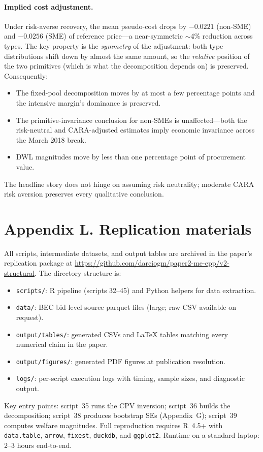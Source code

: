 \documentclass[12pt]{article}
\begin{document}
\paragraph{Implied cost adjustment.}
Under risk-averse recovery, the mean pseudo-cost drops by
$-0.0221$ (non-SME) and $-0.0256$ (SME) of reference price---a
near-symmetric $\sim$4\% reduction across types. The key
property is the \emph{symmetry} of the adjustment: both type
distributions shift down by almost the same amount, so the
\emph{relative} position of the two primitives (which is what
the decomposition depends on) is preserved. Consequently:
\begin{itemize}
\item The fixed-pool decomposition moves by at most a few
percentage points and the intensive margin's dominance is
preserved.
\item The primitive-invariance conclusion for non-SMEs is
unaffected---both the risk-neutral and CARA-adjusted estimates
imply economic invariance across the March 2018 break.
\item DWL magnitudes move by less than one percentage point of
procurement value.
\end{itemize}

The headline story does not hinge on assuming risk neutrality;
moderate CARA risk aversion preserves every qualitative conclusion.

\section*{Appendix L. Replication materials}
\label{app:replication}

All scripts, intermediate datasets, and output tables are
archived in the paper's replication package at
\url{https://github.com/darciogm/paper2-me-epp/v2-structural}.
The directory structure is:
\begin{itemize}
\item \texttt{scripts/}: R pipeline (scripts 32--45) and Python
helpers for data extraction.
\item \texttt{data/}: BEC bid-level source parquet files (large;
raw CSV available on request).
\item \texttt{output/tables/}: generated CSVs and \LaTeX{} tables
matching every numerical claim in the paper.
\item \texttt{output/figures/}: generated PDF figures at
publication resolution.
\item \texttt{logs/}: per-script execution logs with timing,
sample sizes, and diagnostic output.
\end{itemize}

Key entry points: script~35 runs the CPV inversion; script~36
builds the decomposition; script~38 produces bootstrap SEs
(Appendix~G); script~39 computes welfare magnitudes. Full
reproduction requires R~4.5+ with \texttt{data.table},
\texttt{arrow}, \texttt{fixest}, \texttt{duckdb}, and
\texttt{ggplot2}. Runtime on a standard laptop: 2--3 hours
end-to-end.
\end{document}

